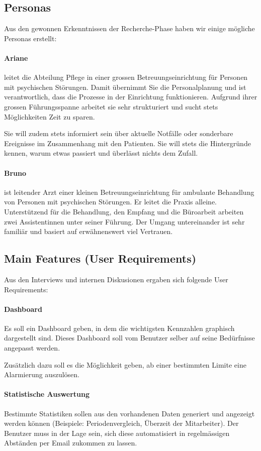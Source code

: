 \documentclass[a4paper]{scrreprt}
\begin{document}
\subsection{Personas}
Aus den gewonnen Erkenntnissen der Recherche-Phase haben wir einige mögliche Personas erstellt:

\paragraph{Ariane} leitet die Abteilung Pflege in einer grossen Betreuungseinrichtung für Personen mit psychischen Störungen. Damit übernimmt Sie die Personalplanung und ist verantwortlich, dass die Prozesse in der Einrichtung funktionieren. Aufgrund ihrer grossen Führungsspanne arbeitet sie sehr strukturiert und sucht stets Möglichkeiten Zeit zu sparen.

Sie will zudem stets informiert sein über aktuelle Notfälle oder sonderbare Ereignisse im Zusammenhang mit den Patienten. Sie will stets die Hintergründe kennen, warum etwas passiert und überlässt nichts dem Zufall.


\paragraph{Bruno} ist leitender Arzt einer kleinen Betreuungseinrichtung für ambulante Behandlung von Personen mit psychischen Störungen. Er leitet die Praxis alleine. Unterstützend für die Behandlung, den Empfang und die Büroarbeit arbeiten zwei Assistentinnen unter seiner Führung. Der Umgang untereinander ist sehr familiär und basiert auf erwähnenswert viel Vertrauen.

\subsection{Main Features (User Requirements)}
Aus den Interviews und internen Diskusionen ergaben sich folgende User Requirements:

\paragraph{Dashboard}
Es soll ein Dashboard geben, in dem die wichtigsten Kennzahlen graphisch dargestellt sind. Dieses Dashboard soll vom Benutzer selber auf seine Bedürfnisse angepasst werden. 

Zusätzlich dazu soll es die Möglichkeit geben, ab einer bestimmten Limite eine Alarmierung auszulösen. 

\paragraph{Statistische Auswertung}
Bestimmte Statistiken sollen aus den vorhandenen Daten generiert und angezeigt werden können (Beispiele: Periodenvergleich, Überzeit der Mitarbeiter). Der Benutzer muss in der Lage sein, sich diese automatisiert in regelmässigen Abständen per Email zukommen zu lassen.
\end{document}
